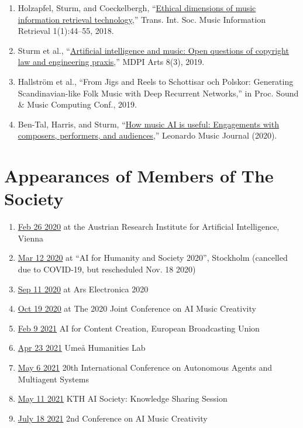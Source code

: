 \documentclass[a4paper,notitlepage,twoside]{book}
\begin{document}
\begin{enumerate}
\item Holzapfel, Sturm, and Coeckelbergh, “\href{https://transactions.ismir.net/articles/10.5334/tismir.13/}{Ethical dimensions of music information retrieval technology},” Trans. Int. Soc. Music Information Retrieval 1(1):44--55, 2018.
\item Sturm et al., “\href{https://www.mdpi.com/2076-0752/8/3/115}{Artificial intelligence and music: Open questions of copyright law and engineering praxis},” MDPI Arts 8(3), 2019.
\item Hallstr\"om et al., ``From Jigs and Reels to Schottisar och Polskor: Generating Scandinavian-like Folk Music with Deep Recurrent Networks,'' in Proc. Sound \& Music Computing Conf., 2019.
\item Ben-Tal, Harris, and Sturm, ``\href{https://www.mitpressjournals.org/doi/abs/10.1162/leon_a_01959}{How music AI is useful: Engagements with composers, performers, and audiences},'' Leonardo Music Journal (2020).
\end{enumerate}

\section{Appearances of Members of The Society}
\begin{enumerate}
\item \href{https://www.facebook.com/events/121474282609573/}{Feb 26 2020} at the Austrian Research Institute for Artificial Intelligence, Vienna
\item \href{https://wasp-hs.org/events/kick-off-wasp-hs/}{Mar 12 2020} at ``AI for Humanity and Society 2020'', Stockholm (cancelled due to COVID-19, but rescheduled Nov. 18 2020)
\item \href{https://ars.electronica.art/keplersgardens/en/kth/}{Sep 11 2020} at Ars Electronica 2020
\item \href{https://boblsturm.github.io/aimusic2020/}{Oct 19 2020} at The 2020 Joint Conference on AI Music Creativity 
\item \href{https://www.ebu.ch/events/2021/02/ai-for-content-creation}{Feb 9 2021} AI for Content Creation, European Broadcasting Union
\item \href{https://www.umu.se/en/events/music-ai-and-digital-tools_10320887}{Apr 23 2021} Umeå Humanities Lab
\item \href{https://aamas2021.soton.ac.uk/programme/social-activities}{May 6 2021} 20th International Conference on Autonomous Agents and Multiagent Systems
\item \href{https://kthais.com/events/event/knowledge-sharing-session-6}{May 11 2021} KTH AI Society: Knowledge Sharing Session
\item \href{https://aimc2021.iem.at/}{July 18 2021} 2nd Conference on AI Music Creativity
\end{enumerate}
\end{document}
